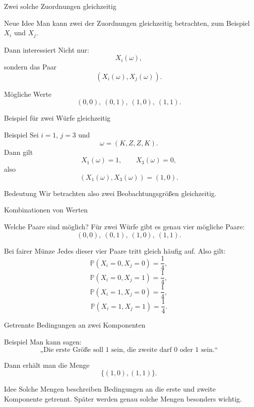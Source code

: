 \documentclass{beamer}
\begin{document}
\begin{frame}{Zwei solche Zuordnungen gleichzeitig}
\begin{block}{Neue Idee}
Man kann zwei der Zuordnungen gleichzeitig betrachten, zum Beispiel \(X_i\) und \(X_j\).
\end{block}

\begin{block}{Dann interessiert}
Nicht nur:
\[
X_i(\omega),
\]
sondern das Paar
\[
(X_i(\omega),X_j(\omega)).
\]
\end{block}

\begin{block}{Mögliche Werte}
\[
(0,0),\ (0,1),\ (1,0),\ (1,1).
\]
\end{block}
\end{frame}

\begin{frame}{Beispiel für zwei Würfe gleichzeitig}
\begin{block}{Beispiel}
Sei \(i=1\), \(j=3\) und
\[
\omega=(K,Z,Z,K).
\]
Dann gilt
\[
X_1(\omega)=1,\qquad X_3(\omega)=0,
\]
also
\[
(X_1(\omega),X_3(\omega))=(1,0).
\]
\end{block}

\begin{block}{Bedeutung}
Wir betrachten also zwei Beobachtungsgrößen gleichzeitig.
\end{block}
\end{frame}

\begin{frame}{Kombinationen von Werten}
\begin{block}{Welche Paare sind möglich?}
Für zwei Würfe gibt es genau vier mögliche Paare:
\[
(0,0),\ (0,1),\ (1,0),\ (1,1).
\]
\end{block}

\begin{block}{Bei fairer Münze}
Jedes dieser vier Paare tritt gleich häufig auf.
Also gilt:
\[
\mathbb P(X_i=0,X_j=0)=\frac14,
\]
\[
\mathbb P(X_i=0,X_j=1)=\frac14,
\]
\[
\mathbb P(X_i=1,X_j=0)=\frac14,
\]
\[
\mathbb P(X_i=1,X_j=1)=\frac14.
\]
\end{block}
\end{frame}

\begin{frame}{Getrennte Bedingungen an zwei Komponenten}
\begin{block}{Beispiel}
Man kann sagen:
\[
\text{„Die erste Größe soll \(1\) sein, die zweite darf \(0\) oder \(1\) sein.“}
\]
\end{block}

\begin{block}{Dann erhält man die Menge}
\[
\{(1,0),(1,1)\}.
\]
\end{block}

\begin{block}{Idee}
Solche Mengen beschreiben Bedingungen an die erste und zweite Komponente getrennt.
Später werden genau solche Mengen besonders wichtig.
\end{block}
\end{frame}
\end{document}
